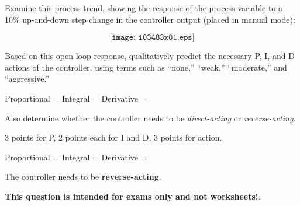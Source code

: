 

Examine this process trend, showing the response of the process variable to a 10\% up-and-down step change in the controller output (placed in manual mode):

$$\texttt{[image: i03483x01.eps]}$$

Based on this open loop response, qualitatively predict the necessary P, I, and D actions of the controller, using terms such as ``none,'' ``weak,'' ``moderate,'' and ``aggressive.''

\vskip 10pt

Proportional = \underbar{\hskip 70pt} \hskip 20pt Integral = \underbar{\hskip 70pt} \hskip 20pt Derivative = \underbar{\hskip 70pt}

\vskip 10pt

Also determine whether the controller needs to be {\it direct-acting} or {\it reverse-acting}.







3 points for P, 2 points each for I and D, 3 points for action.

\vskip 10pt

\noindent
Proportional =  \hskip 10pt Integral =  \hskip 10pt Derivative = 

\vskip 10pt

The controller needs to be {\bf reverse-acting}.







{\bf This question is intended for exams only and not worksheets!}.



